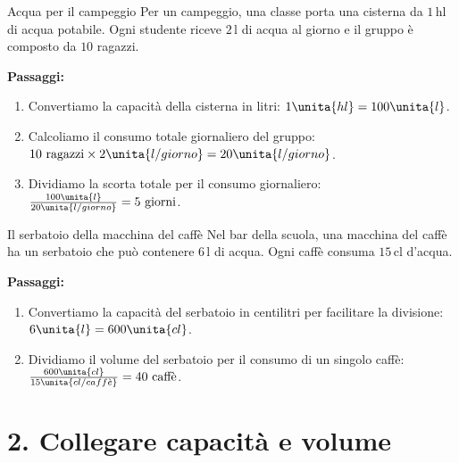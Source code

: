 \begin{esercizio}{Acqua per il campeggio}
Per un campeggio, una classe porta una cisterna da $1\,\mathrm{hl}$ di acqua potabile. Ogni studente riceve $2\,\mathrm{l}$ di acqua al giorno e il gruppo è composto da $10$ ragazzi.


\responsespace{7cm}

\begin{soluzione}
  \textbf{Passaggi:}
  \begin{enumerate}
    \item Convertiamo la capacità della cisterna in litri: $1\unita{hl} = 100\unita{l}$.
    \item Calcoliamo il consumo totale giornaliero del gruppo: $10\text{ ragazzi} \times 2\unita{l/giorno} = 20\unita{l/giorno}$.
    \item Dividiamo la scorta totale per il consumo giornaliero: $\frac{100\unita{l}}{20\unita{l/giorno}} = 5\text{ giorni}$.
  \end{enumerate}
\end{soluzione}
\end{esercizio}

\begin{esercizio}{Il serbatoio della macchina del caffè}
Nel bar della scuola, una macchina del caffè ha un serbatoio che può contenere $6\,\mathrm{l}$ di acqua. Ogni caffè consuma $15\,\mathrm{cl}$ d'acqua.


\responsespace{5.8cm}

\begin{soluzione}
  \textbf{Passaggi:}
  \begin{enumerate}
    \item Convertiamo la capacità del serbatoio in centilitri per facilitare la divisione: $6\unita{l} = 600\unita{cl}$.
    \item Dividiamo il volume del serbatoio per il consumo di un singolo caffè: $\frac{600\unita{cl}}{15\unita{cl/caff\grave{e}}} = 40\text{ caffè}$.
  \end{enumerate}
\end{soluzione}
\end{esercizio}

\condnewpage

\section*{2. Collegare capacità e volume}

